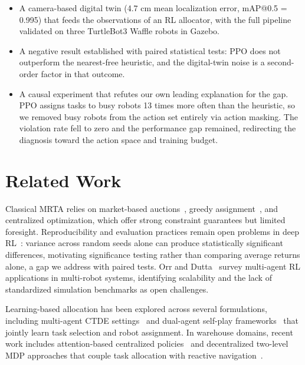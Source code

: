 \documentclass[conference]{IEEEtran}
\begin{document}
\begin{itemize}
\item A camera-based digital twin (4.7 cm mean localization error, mAP@0.5 = 0.995) that feeds the observations of an RL allocator, with the full pipeline validated on three TurtleBot3 Waffle robots in Gazebo.
\item A negative result established with paired statistical tests: PPO does not outperform the nearest-free heuristic, and the digital-twin noise is a second-order factor in that outcome.
\item A causal experiment that refutes our own leading explanation for the gap. PPO assigns tasks to busy robots 13 times more often than the heuristic, so we removed busy robots from the action set entirely via action masking. The violation rate fell to zero and the performance gap remained, redirecting the diagnosis toward the action space and training budget.
\end{itemize}

\section{Related Work}

Classical MRTA relies on market-based auctions~\cite{dias2006market}, greedy assignment~\cite{gerkey2004formal}, and centralized optimization, which offer strong constraint guarantees but limited foresight. Reproducibility and evaluation practices remain open problems in deep RL~\cite{henderson2018deep}: variance across random seeds alone can produce statistically significant differences, motivating significance testing rather than comparing average returns alone, a gap we address with paired tests. Orr and Dutta~\cite{orr2023survey} survey multi-agent RL applications in multi-robot systems, identifying scalability and the lack of standardized simulation benchmarks as open challenges.

Learning-based allocation has been explored across several formulations, including multi-agent CTDE settings~\cite{lowe2017multi} and dual-agent self-play frameworks~\cite{pal2025together} that jointly learn task selection and robot assignment. In warehouse domains, recent work includes attention-based centralized policies~\cite{agrawal2023rtaw} and decentralized two-level MDP approaches that couple task allocation with reactive navigation~\cite{agrawal2022dcmrta}.
\end{document}
